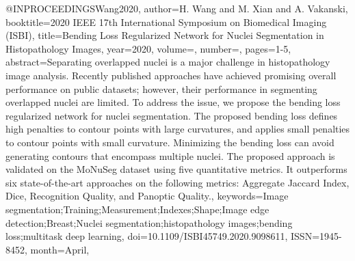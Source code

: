 @INPROCEEDINGS{Wang2020,
  author={H. {Wang} and M. {Xian} and A. {Vakanski}},
  booktitle={2020 IEEE 17th International Symposium on Biomedical Imaging (ISBI)}, 
  title={Bending Loss Regularized Network for Nuclei Segmentation in Histopathology Images}, 
  year={2020},
  volume={},
  number={},
  pages={1-5},
  abstract={Separating overlapped nuclei is a major challenge in histopathology image analysis. Recently published approaches have achieved promising overall performance on public datasets; however, their performance in segmenting overlapped nuclei are limited. To address the issue, we propose the bending loss regularized network for nuclei segmentation. The proposed bending loss defines high penalties to contour points with large curvatures, and applies small penalties to contour points with small curvature. Minimizing the bending loss can avoid generating contours that encompass multiple nuclei. The proposed approach is validated on the MoNuSeg dataset using five quantitative metrics. It outperforms six state-of-the-art approaches on the following metrics: Aggregate Jaccard Index, Dice, Recognition Quality, and Panoptic Quality.},
  keywords={Image segmentation;Training;Measurement;Indexes;Shape;Image edge detection;Breast;Nuclei segmentation;histopathology images;bending loss;multitask deep learning},
  doi={10.1109/ISBI45749.2020.9098611},
  ISSN={1945-8452},
  month={April},}

